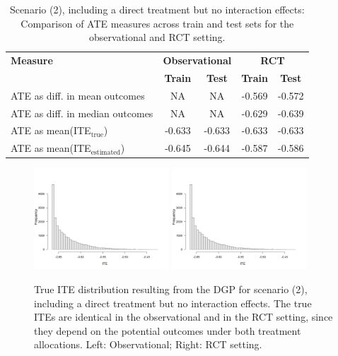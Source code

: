 \begin{table}[htbp]
\centering
\caption{Scenario (2), including a direct treatment but no interaction effects: Comparison of ATE measures across train and test sets for the observational and RCT setting.}
\label{tab:scenario2_ate_comparison}
\begin{tabular}{l c c c c}
\toprule
\textbf{Measure} & \multicolumn{2}{c}{\textbf{Observational}} & \multicolumn{2}{c}{\textbf{RCT}} \\
\cmidrule(lr){2-3} \cmidrule(lr){4-5}
 & \textbf{Train} & \textbf{Test} & \textbf{Train} & \textbf{Test} \\
\midrule
ATE as diff. in mean outcomes & NA & NA & -0.569 & -0.572 \\
ATE as diff. in median outcomes & NA & NA & -0.629 & -0.639 \\
ATE as mean(ITE$_\text{true}$)  & -0.633 & -0.633 & -0.633 & -0.633 \\
ATE as mean(ITE$_\text{estimated}$) & -0.645 & -0.644 & -0.587 & -0.586 \\
\bottomrule
\end{tabular}
\end{table}



\begin{figure}[htbp]
\centering
\includegraphics[width=0.45\textwidth]{img/results/observ_scenario2_ite_distribution_dgp.png}
\includegraphics[width=0.45\textwidth]{img/results/rct_scenario2_ite_distribution_dgp.png}
\caption{True ITE distribution resulting from the DGP for scenario (2), including a direct treatment but no interaction effects. The true ITEs are identical in the observational and in the RCT setting, since they depend on the potential outcomes under both treatment allocations. Left: Observational; Right: RCT setting.}
\label{fig:scenario2_ite_distribution_dgp}
\end{figure}



